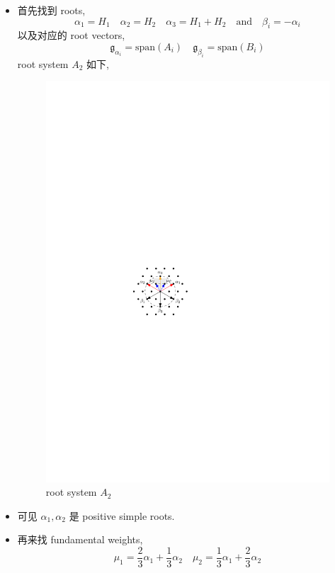 \begin{itemize}
	\item 首先找到 roots,
	\begin{equation}
		\alpha_1 = H_1 \quad \alpha_2 = H_2 \quad \alpha_3 = H_1 + H_2 \quad \text{and} \quad \beta_i = - \alpha_i
	\end{equation}
	以及对应的 root vectors,
	\begin{equation}
		\mathfrak{g}_{\alpha_i} = \mathrm{span}(A_i) \quad \mathfrak{g}_{\beta_i} = \mathrm{span}(B_i)
	\end{equation}
	root system $A_2$ 如下,
	
	\begin{figure}[H]
		\centering
		\includegraphics[scale=1]{figures/root system A2.pdf}
		\caption{root system $A_2$}
	\end{figure}
	
	\item 可见 $\alpha_1, \alpha_2$ 是 positive simple roots.
	
	\item 再来找 fundamental weights,
	\begin{equation}
		\mu_1 = \frac{2}{3} \alpha_1 + \frac{1}{3} \alpha_2 \quad \mu_2 = \frac{1}{3} \alpha_1 + \frac{2}{3} \alpha_2
	\end{equation}
\end{itemize}

